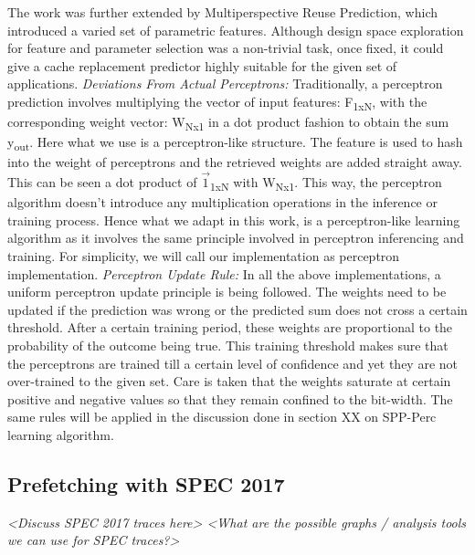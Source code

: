 \documentclass{sig-alternate}
\begin{document}
The work was further extended by Multiperspective Reuse Prediction\cite{Multiperspective}, which introduced a varied set of parametric features. 
Although design space exploration for feature and parameter selection was a non-trivial task, once fixed, it could give a cache replacement predictor highly suitable for the given set of applications.
\newline
\newline
\textit{Deviations From Actual Perceptrons:} Traditionally, a perceptron prediction involves multiplying the vector of input features: F\textsubscript{1xN}, with the corresponding weight vector: W\textsubscript{Nx1} in a dot product fashion to obtain the sum y\textsubscript{out}. 
Here what we use is a perceptron-like structure. 
The feature is used to hash into the weight of perceptrons and the retrieved weights are added straight away. 
This can be seen a dot product of $\vec{1}$\textsubscript{1xN} with W\textsubscript{Nx1}. 
This way, the perceptron algorithm doesn't introduce any multiplication operations in the inference or training process. 
Hence what we adapt in this work, is a perceptron-like learning algorithm as it involves the same principle involved in perceptron inferencing and training. 
For simplicity, we will call our implementation as perceptron implementation.
\newline
\newline
\textit{Perceptron Update Rule:} In all the above implementations, a uniform perceptron update principle is being followed. 
The weights need to be updated if the prediction was wrong or the predicted sum does not cross a certain threshold. 
After a certain training period, these weights are proportional to the probability of the outcome being true. 
This training threshold makes sure that the perceptrons are trained till a certain level of confidence and yet they are not over-trained to the given set. 
Care is taken that the weights saturate at certain positive and negative values so that they remain confined to the bit-width. 
The same rules will be applied in the discussion done in section XX on SPP-Perc learning algorithm.

 
\subsection{Prefetching with SPEC 2017}
\textit{<Discuss SPEC 2017 traces here>
<What are the possible graphs / analysis tools we can use for SPEC traces?>}
\end{document}
